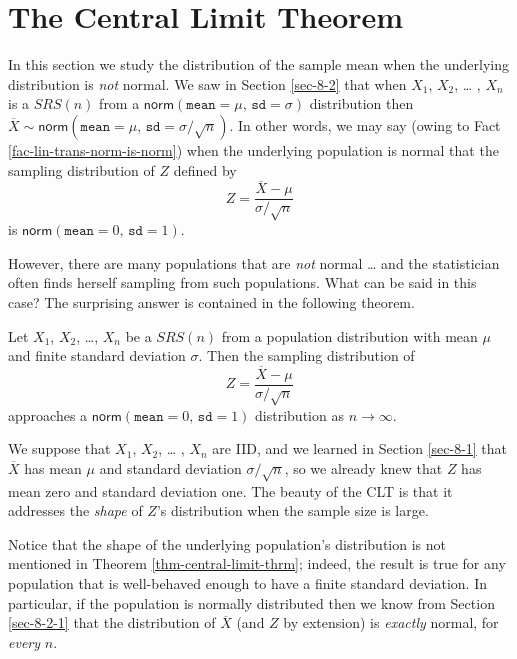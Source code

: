 \section{The Central Limit Theorem}
\label{sec-8-3}

In this section we study the distribution of the sample mean when the
underlying distribution is \emph{not} normal. We saw in Section \ref{sec-8-2} that when \(X_{1}\), \(X_{2}\), \ldots{} , \(X_{n}\) is a
\(SRS(n)\) from a
\(\mathsf{norm}(\mathtt{mean}=\mu,\,\mathtt{sd}=\sigma)\) distribution
then \(\overline{X} \sim \mathsf{norm}(\mathtt{mean} =
\mu,\,\mathtt{sd} = \sigma/\sqrt{n})\). In other words, we may say
(owing to Fact \ref{fac-lin-trans-norm-is-norm}) when the underlying
population is normal that the sampling distribution of \(Z\) defined
by
\begin{equation}
Z=\frac{\overline{X}-\mu}{\sigma/\sqrt{n}}
\end{equation}
is \(\mathsf{norm}(\mathtt{mean}=0,\,\mathtt{sd}=1)\). 

However, there are many populations that are \emph{not} normal \ldots{} and the
statistician often finds herself sampling from such populations. What
can be said in this case? The surprising answer is contained in the
following theorem.

\begin{thm}
\label{thm-central-limit-thrm} Let \(X_{1}\), \(X_{2}\), \ldots{}, \(X_{n}\) be
a \(SRS(n)\) from a population distribution with mean \(\mu\) and
finite standard deviation \(\sigma\). Then the sampling distribution
of
\begin{equation}
Z=\frac{\overline{X}-\mu}{\sigma/\sqrt{n}}
\end{equation}
approaches a \(\mathsf{norm}(\mathtt{mean}=0,\,\mathtt{sd}=1)\) distribution as \(n\to\infty\).
\end{thm}

\begin{rem}
We suppose that \(X_{1}\), \(X_{2}\), \ldots{} , \(X_{n}\) are IID, and we
learned in Section \ref{sec-8-1} that \(\overline{X}\) has
mean \(\mu\) and standard deviation \(\sigma/\sqrt{n}\), so we already
knew that \(Z\) has mean zero and standard deviation one. The beauty
of the CLT is that it addresses the \emph{shape} of \(Z\)'s distribution
when the sample size is large.
\end{rem}

\begin{rem}
Notice that the shape of the underlying population's distribution is
not mentioned in Theorem \ref{thm-central-limit-thrm}; indeed, the result is true for any
population that is well-behaved enough to have a finite standard
deviation. In particular, if the population is normally distributed
then we know from Section \ref{sec-8-2-1} that the distribution
of \(\overline{X}\) (and \(Z\) by extension) is \emph{exactly} normal, for
\emph{every} \(n\).
\end{rem}

